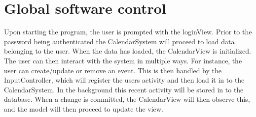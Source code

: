 \section{Global software control}
Upon starting the program, the user is prompted with the loginView. Prior to the password being authenticated the CalendarSystem will proceed to load data belonging to the user. When the data has loaded, the CalendarView is initialized.
The user can then interact with the system in multiple ways. For instance, the user can create/update or remove an event. This is then handled by the InputController, which will register the users activity and then load it in to the CalendarSystem. In the background this recent activity will be stored in to the database. When a change is committed, the CalendarView will then observe this, and the model will then proceed to update the view.
